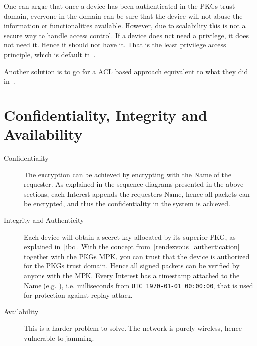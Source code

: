 One can argue that once a device has been authenticated in the \gls{PKG}s trust domain, everyone in the domain can be sure that the device will not abuse the information or functionalities available. 
However, due to scalability this is not a secure way to handle access control. 
If a device does not need a privilege, it does not need it.
Hence it should not have it. 
That is the least privilege access principle, which is default in~\cite{DBLP:conf/imis/GusmeroliPR12}.

Another solution is to go for a \gls{ACL} based approach equivalent to what they did in~\cite{DBLP:journals/network/ShangDMBZ14}.

\section{Confidentiality, Integrity and Availability}

\begin{description}
  \item[Confidentiality] 
  The encryption can be achieved by encrypting with the Name of the requester.
  As explained in the sequence diagrams presented in the above sections, each Interest appends the requesters Name, hence all packets can be encrypted, and thus the confidentiality in the system is achieved.
  \item[Integrity and Authenticity]
  Each device will obtain a secret key allocated by its superior \gls{PKG}, as explained in~\autoref{ibc}.
  With the concept from~\autoref{rendezvous_authentication} together with the \gls{PKG}s \gls{MPK}, you can trust that the device is authorized for the \gls{PKG}s trust domain. Hence all signed packets can be verified by anyone with the \gls{MPK}.
  Every Interest has a timestamp attached to the Name (e.g. ), i.e. milliseconds from \texttt{UTC 1970-01-01 00:00:00}, that is used for protection against replay attack. 
  \item[Availability]
  This is a harder problem to solve.
  The network is purely wireless, hence vulnerable to jamming. 
\end{description}